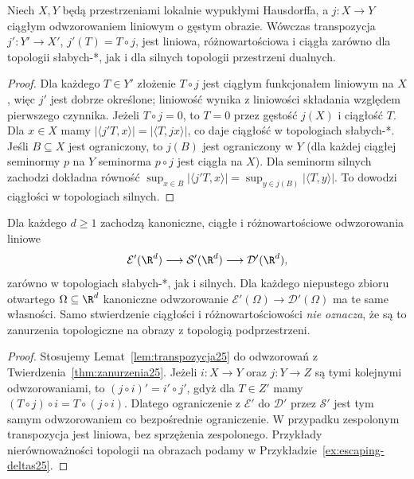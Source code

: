 \begin{lemat}
\label{lem:transpozycja25}
Niech $X,Y$ będą przestrzeniami lokalnie wypukłymi
Hausdorffa, a $j:X\to Y$ ciągłym odwzorowaniem liniowym
o gęstym obrazie. Wówczas transpozycja
$j':Y'\to X'$, $j'(T)=T\circ j$, jest liniowa,
różnowartościowa i ciągła zarówno dla topologii słabych-*, jak i dla
silnych topologii przestrzeni dualnych.
\end{lemat}
\begin{proof}
Dla każdego $T\in Y'$ złożenie $T\circ j$ jest ciągłym
funkcjonałem liniowym na $X$, więc $j'$ jest dobrze
określone; liniowość wynika z liniowości składania
względem pierwszego czynnika. Jeżeli $T\circ j=0$,
to $T=0$ przez gęstość $j(X)$ i ciągłość $T$.
Dla $x\in X$ mamy
$|\langle j'T,x\rangle|=|\langle T,jx\rangle|$,
co daje ciągłość w topologiach słabych-*.
Jeśli $B\subseteq X$ jest ograniczony, to $j(B)$ jest
ograniczony w $Y$ (dla każdej ciągłej seminormy $p$
na $Y$ seminorma $p\circ j$ jest ciągła na $X$).
Dla seminorm silnych zachodzi dokładna równość
$\sup_{x\in B}|\langle j'T,x\rangle|
= \sup_{y\in j(B)}|\langle T,y\rangle|$.
To dowodzi ciągłości w topologiach silnych.
\end{proof}

\begin{wniosek}
\label{cor:dual-lancuch25}
Dla każdego $d\ge1$ zachodzą kanoniczne, ciągłe i
różnowartościowe odwzorowania liniowe
\[
 \mathcal E'(\R^d)\longrightarrow\mathcal S'(\R^d)
 \longrightarrow\mathcal D'(\R^d),
\]
zarówno w topologiach słabych-*, jak i silnych.
Dla każdego niepustego zbioru otwartego $\Omega\subseteq\R^d$
kanoniczne odwzorowanie
$\mathcal E'(\Omega)\to\mathcal D'(\Omega)$
ma te same własności. Samo stwierdzenie ciągłości i
różnowartościowości \emph{nie oznacza}, że są to zanurzenia
topologiczne na obrazy z topologią podprzestrzeni.
\end{wniosek}
\begin{proof}
Stosujemy Lemat~\ref{lem:transpozycja25} do odwzorowań
z Twierdzenia~\ref{thm:zanurzenia25}. Jeżeli $i:X\to Y$
oraz $j:Y\to Z$ są tymi kolejnymi odwzorowaniami,
to $(j\circ i)'=i'\circ j'$, gdyż dla $T\in Z'$
mamy $(T\circ j)\circ i=T\circ(j\circ i)$.
Dlatego ograniczenie z $\mathcal E'$ do $\mathcal D'$
przez $\mathcal S'$ jest tym samym odwzorowaniem co
bezpośrednie ograniczenie. W przypadku zespolonym
transpozycja jest liniowa, bez sprzężenia zespolonego.
Przykłady nierównoważności topologii na obrazach
podamy w Przykładzie~\ref{ex:escaping-deltas25}.
\end{proof}

